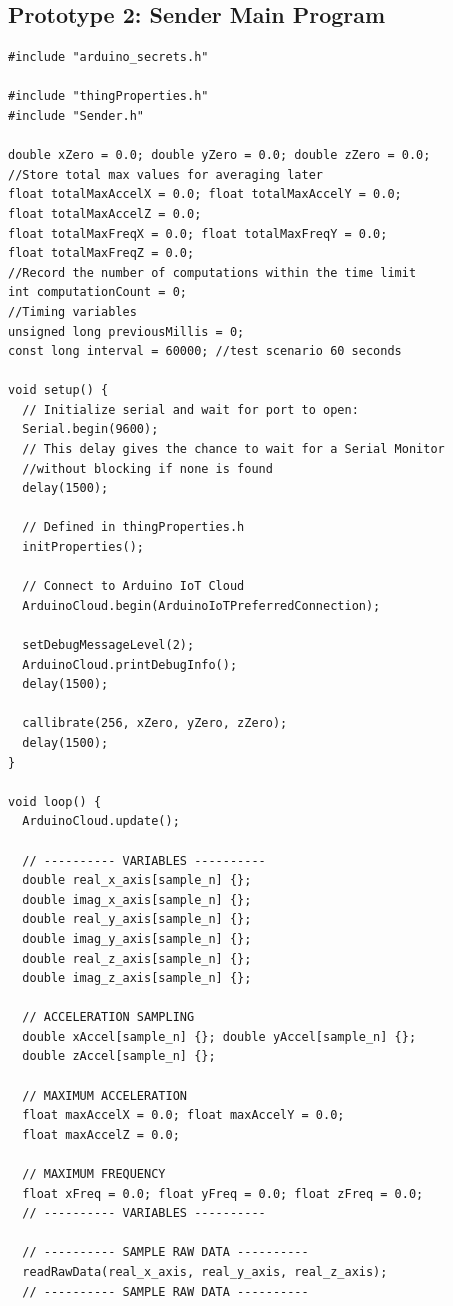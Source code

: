 \subsection{Prototype 2: Sender Main Program}
\begin{verbatim}
#include "arduino_secrets.h"

#include "thingProperties.h"
#include "Sender.h"

double xZero = 0.0; double yZero = 0.0; double zZero = 0.0;
//Store total max values for averaging later
float totalMaxAccelX = 0.0; float totalMaxAccelY = 0.0; 
float totalMaxAccelZ = 0.0;
float totalMaxFreqX = 0.0; float totalMaxFreqY = 0.0; 
float totalMaxFreqZ = 0.0;
//Record the number of computations within the time limit
int computationCount = 0;
//Timing variables
unsigned long previousMillis = 0;
const long interval = 60000; //test scenario 60 seconds

void setup() {
  // Initialize serial and wait for port to open:
  Serial.begin(9600);
  // This delay gives the chance to wait for a Serial Monitor 
  //without blocking if none is found
  delay(1500);

  // Defined in thingProperties.h
  initProperties();

  // Connect to Arduino IoT Cloud
  ArduinoCloud.begin(ArduinoIoTPreferredConnection);
  
  setDebugMessageLevel(2);
  ArduinoCloud.printDebugInfo();
  delay(1500);
  
  callibrate(256, xZero, yZero, zZero);
  delay(1500);
}

void loop() {
  ArduinoCloud.update();

  // ---------- VARIABLES ----------
  double real_x_axis[sample_n] {}; 
  double imag_x_axis[sample_n] {};
  double real_y_axis[sample_n] {}; 
  double imag_y_axis[sample_n] {};
  double real_z_axis[sample_n] {}; 
  double imag_z_axis[sample_n] {};

  // ACCELERATION SAMPLING
  double xAccel[sample_n] {}; double yAccel[sample_n] {}; 
  double zAccel[sample_n] {};

  // MAXIMUM ACCELERATION
  float maxAccelX = 0.0; float maxAccelY = 0.0; 
  float maxAccelZ = 0.0;

  // MAXIMUM FREQUENCY
  float xFreq = 0.0; float yFreq = 0.0; float zFreq = 0.0;
  // ---------- VARIABLES ----------

  // ---------- SAMPLE RAW DATA ----------
  readRawData(real_x_axis, real_y_axis, real_z_axis);
  // ---------- SAMPLE RAW DATA ----------


\end{verbatim}
